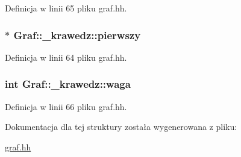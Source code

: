 \-Definicja w linii 65 pliku graf.\-hh.

\hypertarget{struct_graf_1_1__krawedz_adba487ff1b27ab413c139dff7ef02313}{
\subsubsection[{pierwszy}]{$\ast$ {\bf \-Graf\-::\-\_\-krawedz\-::pierwszy}}}\label{struct_graf_1_1__krawedz_adba487ff1b27ab413c139dff7ef02313}


\-Definicja w linii 64 pliku graf.\-hh.

\hypertarget{struct_graf_1_1__krawedz_a32556165c01ba902034186551780c7f4}{
\subsubsection[{waga}]{\setlength{\rightskip}{0pt plus 5cm}int {\bf \-Graf\-::\-\_\-krawedz\-::waga}}}\label{struct_graf_1_1__krawedz_a32556165c01ba902034186551780c7f4}


\-Definicja w linii 66 pliku graf.\-hh.



\-Dokumentacja dla tej struktury została wygenerowana z pliku\-:\begin{DoxyCompactItemize}
\item 
\hyperlink{graf_8hh}{graf.\-hh}\end{DoxyCompactItemize}
